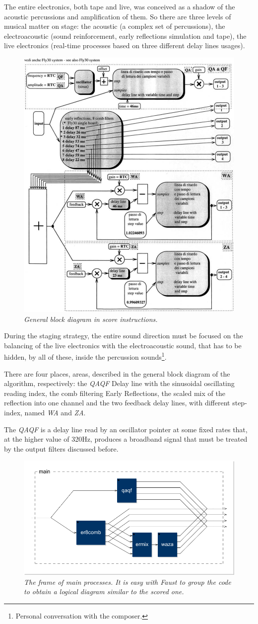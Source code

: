 \documentclass[twoside,a4paper]{article}
\begin{document}
The entire electronics, both tape and live, was conceived as a shadow of the acoustic percussions and amplification of them. So there are three levels of musical matter on stage: the acoustic (a complex set of percussions), the electroacoustic (sound reinforcement, early reflections simulation and tape), the live electronics (real-time processes based on three different delay lines usages).

\begin{figure}[ht]
\centerline{\includegraphics[width=.45\textwidth]{img/1-comp}}
\caption{\label{ml-gen-dia}{\it General block diagram in score instructions.}}
\end{figure}

During the staging strategy, the entire sound direction must be focused on the balancing of the live electronics with the electroacoustic sound, that has to be hidden, by all of these, inside the percussion sounds\footnote{Personal conversation with the composer.}.

There are four places, areas, described in the general block diagram of the algorithm, respectively: the \emph{QAQF} Delay line with the sinusoidal oscillating reading index, the comb filtering  Early Reflections, the scaled mix of the reflection into one channel and the two feedback delay lines, with different step-index, named \emph{WA} and \emph{ZA}.


The \emph{QAQF} is a delay line read by an oscillator pointer at some fixed rates that, at the higher value of 320Hz, produces a broadband signal that must be treated by the output filters discussed before.

\begin{figure}[hb]
\centerline{\includegraphics[width=.45\textwidth]{img/main}}
\caption{\label{ml-main}{\it The frame of main processes. It is easy with Faust to group the code to obtain a logical diagram similar to the scored one. }}
\end{figure}
\end{document}
